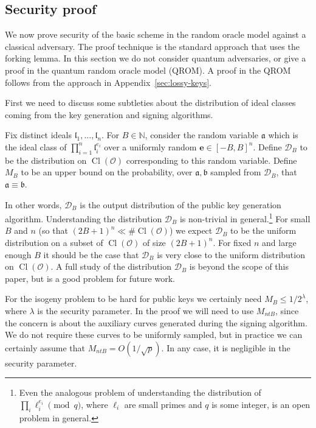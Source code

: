 \documentclass{llncs}
\newcommand{\D}{\mathcal{D}}
\newcommand{\N}{\mathbb{N}}
\newcommand{\OO}{\mathcal{O}}
\DeclareMathOperator{\Cl}{Cl}
\renewcommand{\a}{\mathfrak{a}}
\renewcommand{\b}{\mathfrak{b}}
\renewcommand{\l}{\mathfrak{l}}
\newcommand{\e}{\mathbf{e}}
\begin{document}
\subsection{Security proof}
\label{sec:security-proof}

We now prove security of the basic scheme in the random oracle model against a classical adversary. 
The proof technique is the standard approach that uses the forking lemma.
In this section we do not consider quantum adversaries, or give a proof in the quantum random oracle model (QROM).
A proof in the QROM follows from the approach in Appendix~\ref{sec:lossy-keys}.

First we need to discuss some subtleties about the distribution of ideal classes coming from the key generation and signing algorithms.

\begin{definition} \label{defn:sampling-distributions}
Fix distinct ideals $\l_1, \dots, \l_n$.
For $B \in \N$, consider the random variable $\a$ which is the ideal class of $\prod_{i=1}^n \l_i^{e_i}$ over a uniformly random $\e \in [-B,B]^n$.
Define $\D_B$ to be the distribution on $\Cl( \OO )$ corresponding to this random variable.
%
Define $M_B$ to be an upper bound on the probability, over $\a, \b$ sampled from $\D_B$, that $\a \equiv \b$.
\end{definition}

In other words, $\D_B$ is the output distribution of the public key generation algorithm.
Understanding the distribution $\D_B$ is non-trivial in general.\footnote{Even the analogous problem of understanding the distribution of $\prod_i \ell_i^{e_i} \pmod{q}$, where $\ell_i$ are small primes and $q$ is some integer, is an open problem in general.}
For small $B$ and $n$ (so that $(2B+1)^n \ll \#\Cl(\OO)$) we expect $\D_B$ to be the uniform distribution on a subset of $\Cl(\OO)$ of size $(2B+1)^n$. For fixed $n$ and large enough $B$ it should be the case that $\D_B$ is very close to the uniform distribution on $\Cl(\OO)$.
A full study of the distribution $\D_B$ is beyond the scope of this paper, but is a good problem for future work.

For the isogeny problem to be hard for public keys we certainly need $M_B \le 1/2^\lambda$, where $\lambda$ is the security parameter.
In the proof we will need to use $M_{ntB}$, since the concern is about the auxiliary curves generated during the signing algorithm. We do not require these curves to be uniformly sampled, but in practice we can certainly assume that $M_{ntB} = O( 1/\sqrt{p} )$. In any case, it is negligible in the security parameter.
\end{document}
